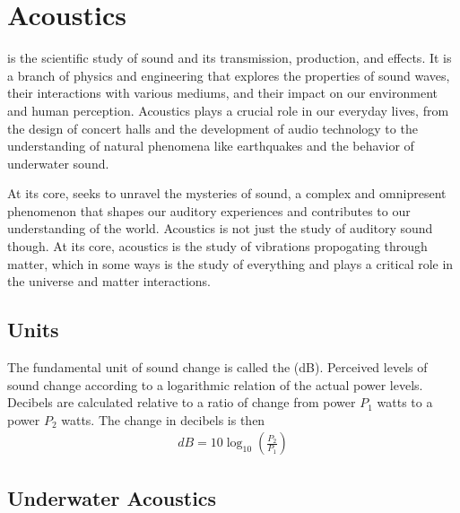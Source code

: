 \chapter{Acoustics}
\thispagestyle{fancy}

 is the scientific study of sound and its transmission, production, and effects. It is a branch of physics and engineering that explores the properties of sound waves, their interactions with various mediums, and their impact on our environment and human perception. Acoustics plays a crucial role in our everyday lives, from the design of concert halls and the development of audio technology to the understanding of natural phenomena like earthquakes and the behavior of underwater sound.

At its core,  seeks to unravel the mysteries of sound, a complex and omnipresent phenomenon that shapes our auditory experiences and contributes to our understanding of the world. Acoustics is not just the study of auditory sound though. At its core, acoustics is the study of vibrations propogating through matter, which in some ways is the study of everything and plays a critical role in the universe and matter interactions.

\section{Units}

The fundamental unit of sound change is called the  (dB). Perceived levels of sound change according to a logarithmic relation of the actual power levels. Decibels are calculated relative to a ratio of change from power $P_1$ watts to a power $P_2$ watts. The change in decibels is then
\begin{align}
dB = 10 \log_{10}\left(\frac{P_2}{P_1}\right)
\end{align}














\section{Underwater Acoustics}

